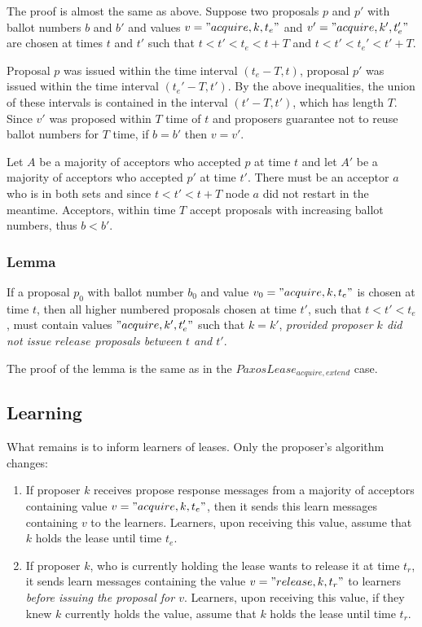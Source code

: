 \documentclass[12pt]{amsart}
\begin{document}
The proof is almost the same as above. Suppose two proposals $p$ and $p'$ with ballot numbers $b$ and $b'$ and values $v = "acquire, k, t_e"$ and $v' = "acquire, k', t_e'"$ are chosen at times $t$ and $t'$ such that $t < t' < t_e < t + T$ and $t < t' < t_e' < t' + T$.

Proposal $p$ was issued within the time interval $(t_e - T, t)$, proposal $p'$ was issued within the time interval $(t_e' - T, t')$. By the above inequalities, the union of these intervals is contained in the interval $(t' - T, t')$, which has length $T$. Since $v'$ was proposed within $T$ time of $t$ and proposers guarantee not to reuse ballot numbers for $T$ time, if $b = b'$ then $v = v'$.

Let $A$ be a majority of acceptors who accepted $p$ at time $t$ and let $A'$ be a majority of acceptors who accepted $p'$ at time $t'$.  There must be an acceptor $a$ who is in both sets and since $t < t' < t + T$ node $a$ did not restart in the meantime. Acceptors, within time $T$ accept proposals with increasing ballot numbers, thus $b < b'$.

\subsubsection{ Lemma } If a proposal $p_0$ with ballot number $b_0$ and value $v_0 = "acquire, k, t_e"$ is chosen at time $t$, then all higher numbered proposals chosen at time $t'$, such that $t < t' < t_e$, must contain values $"acquire, k', t_e'"$ such that $k = k'$, \emph{provided proposer $k$ did not issue $release$ proposals between $t$ and $t'$}.

The proof of the lemma is the same as in the $PaxosLease_{acquire, extend}$ case.

\subsection{ Learning }

What remains is to inform learners of leases. Only the proposer's algorithm changes:

\begin{enumerate}

\item If proposer $k$ receives propose response messages from a majority of acceptors containing value $v = "acquire, k, t_e"$, then it sends this learn messages containing $v$ to the learners. Learners, upon receiving this value, assume that $k$ holds the lease until time $t_e$.

\item If proposer $k$, who is currently holding the lease wants to release it at time $t_r$, it sends learn messages containing the value $v = "release, k, t_r"$ to learners \emph{before issuing the proposal for $v$}. Learners, upon receiving this value, if they knew $k$ currently holds the value, assume that $k$ holds the lease until time $t_r$.

\end{enumerate}
\end{document}
